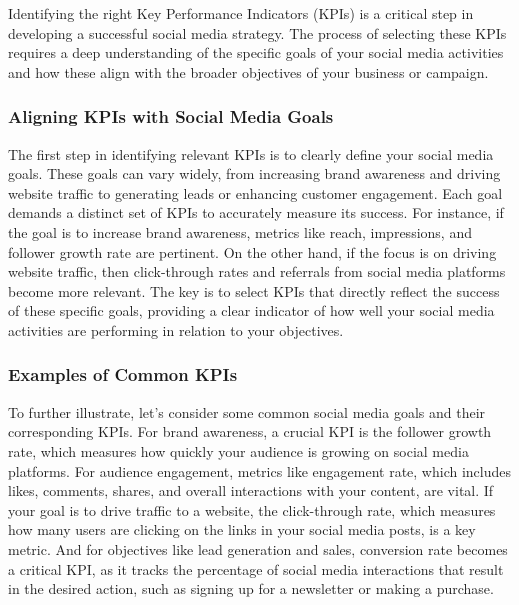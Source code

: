 \documentclass[
]{book}
\begin{document}
Identifying the right Key Performance Indicators (KPIs) is a critical step in developing a successful social media strategy. The process of selecting these KPIs requires a deep understanding of the specific goals of your social media activities and how these align with the broader objectives of your business or campaign.

\hypertarget{aligning-kpis-with-social-media-goals}{%
\subsubsection*{Aligning KPIs with Social Media Goals}\label{aligning-kpis-with-social-media-goals}}

The first step in identifying relevant KPIs is to clearly define your social media goals. These goals can vary widely, from increasing brand awareness and driving website traffic to generating leads or enhancing customer engagement. Each goal demands a distinct set of KPIs to accurately measure its success. For instance, if the goal is to increase brand awareness, metrics like reach, impressions, and follower growth rate are pertinent. On the other hand, if the focus is on driving website traffic, then click-through rates and referrals from social media platforms become more relevant. The key is to select KPIs that directly reflect the success of these specific goals, providing a clear indicator of how well your social media activities are performing in relation to your objectives.

\hypertarget{examples-of-common-kpis}{%
\subsubsection*{Examples of Common KPIs}\label{examples-of-common-kpis}}

To further illustrate, let's consider some common social media goals and their corresponding KPIs. For brand awareness, a crucial KPI is the follower growth rate, which measures how quickly your audience is growing on social media platforms. For audience engagement, metrics like engagement rate, which includes likes, comments, shares, and overall interactions with your content, are vital. If your goal is to drive traffic to a website, the click-through rate, which measures how many users are clicking on the links in your social media posts, is a key metric. And for objectives like lead generation and sales, conversion rate becomes a critical KPI, as it tracks the percentage of social media interactions that result in the desired action, such as signing up for a newsletter or making a purchase.
\end{document}
